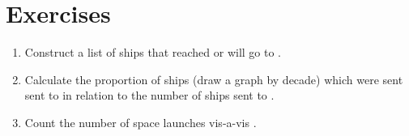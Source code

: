 \section{Exercises}
\begin{enumerate}
  \item Construct a list of ships that reached or will go to .
  \item Calculate the proportion of ships (draw a graph by decade) which were sent 
        sent to  
        in relation to the number of ships sent to .
  \item Count the number of  space launches 
      vis-a-vis .%
\end{enumerate}
